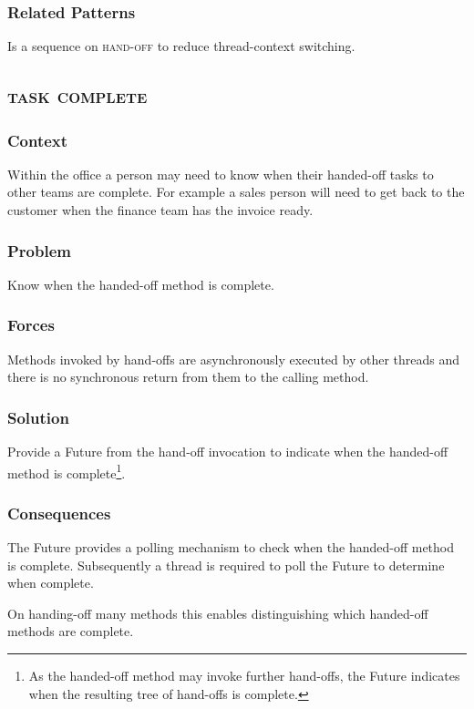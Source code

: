 \documentclass[prodmode]{style/acmlarge}
\begin{document}
\subsubsection*{Related Patterns} Is a sequence on \textsc{hand-off} to reduce
thread-context switching.



\subsection{\textsc{\textbf{task complete}}}

\subsubsection*{Context} Within the office a person may need to know when their
handed-off tasks to other teams are complete.  For example a sales person will
need to get back to the customer when the finance team has the invoice ready.

\subsubsection*{Problem} Know when the handed-off method is complete.

\subsubsection*{Forces} Methods invoked by hand-offs are asynchronously executed by other
threads and there is no synchronous return from them to the calling method.

\subsubsection*{Solution} Provide a Future from the hand-off invocation to
indicate when the handed-off method is complete\footnote{As the handed-off
method may invoke further hand-offs, the Future indicates when the resulting
tree of hand-offs is complete.}.

\subsubsection*{Consequences} The Future provides a polling mechanism to check
when the handed-off method is complete.  Subsequently a thread is required to
poll the Future to determine when complete.

On handing-off many methods this enables distinguishing which handed-off methods
are complete.
\end{document}
